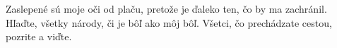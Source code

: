 Zaslepené sú moje oči od plaču, pretože je ďaleko ten, čo by ma zachránil.
Hľaďte, všetky národy,
\versseparator
či je bôľ ako môj bôľ.
\versseparator
Všetci, čo prechádzate cestou, pozrite a viďte.